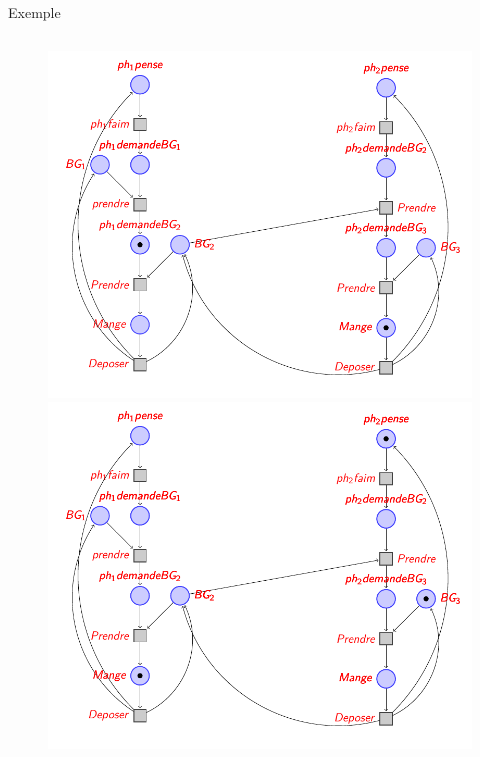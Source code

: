 \begin{frame}{Exemple}
\begin{columns}
\begin{column}{0.4\textwidth}
\begin{figure}
{					\includegraphics[width=\linewidth]{resources/testpetri5}
				}
				\only<6-6>
				{
					\includegraphics[width=\linewidth]{resources/testpetri6}
				}
				\only<7->
				{
}
\end{figure}
\end{column}
\end{columns}
\end{frame}
